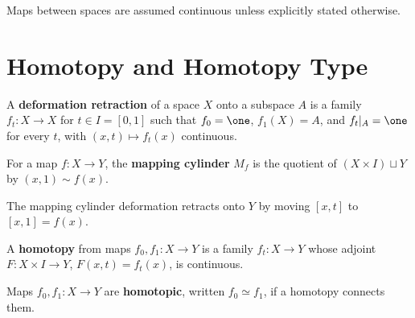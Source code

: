 
Maps between spaces are assumed continuous unless explicitly stated otherwise.

\section{Homotopy and Homotopy Type}

\begin{definition}
\label{def:deformation-retraction}





A \textbf{deformation retraction} of a space $X$ onto a subspace $A$ is a family
$f_t:X\to X$ for $t\in I=[0,1]$ such that $f_0=\one$, $f_1(X)=A$, and
$f_t|_A=\one$ for every $t$, with $(x,t)\mapsto f_t(x)$ continuous.
\end{definition}

\begin{definition}
\label{def:mapping-cylinder}




For a map $f:X\to Y$, the \textbf{mapping cylinder} $M_f$ is the quotient of
$(X\times I)\sqcup Y$ by $(x,1)\sim f(x)$.
\end{definition}

The mapping cylinder deformation retracts onto $Y$ by moving $[x,t]$ to $[x,1]=f(x)$.

\begin{definition}[Homotopy]
\label{def:homotopy}




A \textbf{homotopy} from maps $f_0,f_1:X\to Y$ is a family $f_t:X\to Y$ whose
adjoint $F:X\times I\to Y$, $F(x,t)=f_t(x)$, is continuous.
\end{definition}

\begin{definition}
\label{def:homotopic-maps}





Maps $f_0,f_1:X\to Y$ are \textbf{homotopic}, written $f_0\simeq f_1$, if a homotopy
connects them.
\end{definition}

